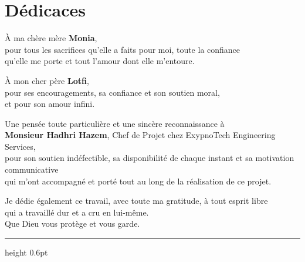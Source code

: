 \documentclass[12pt,a4paper]{report}
\begin{document}
\pagestyle{plain}

\chapter*{Dédicaces}

\vspace{0.8cm}

\begin{center}
\begin{minipage}{0.85\textwidth}
\centering
\itshape

À ma chère mère \textbf{Monia},\\[2pt]
pour tous les sacrifices qu'elle a faits pour moi, toute la confiance\\
qu'elle me porte et tout l'amour dont elle m'entoure.

\vspace{0.9cm}

À mon cher père \textbf{Lotfi},\\[2pt]
pour ses encouragements, sa confiance et son soutien moral,\\
et pour son amour infini.

\vspace{0.9cm}

Une pensée toute particulière et une sincère reconnaissance à\\
\textbf{Monsieur Hadhri Hazem}, Chef de Projet chez ExypnoTech Engineering
Services,\\
pour son soutien indéfectible, sa disponibilité de chaque instant et sa
motivation communicative\\
qui m'ont accompagné et porté tout au long de la réalisation de ce projet.

\vspace{0.9cm}

Je dédie également ce travail, avec toute ma gratitude, à tout esprit libre\\
qui a travaillé dur et a cru en lui-même.\\
Que Dieu vous protège et vous garde.

\end{minipage}
\end{center}

\vspace{1.1cm}
{\color{rougeEsprit}\hrule height 0.6pt}
\vspace{1cm}
\end{document}
